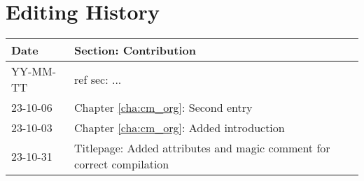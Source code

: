 \cleardoublepage
{}
\chapter*{Editing History}
\label{cha:history}


\begin{longtable}{ |p{2cm}|p{12cm}|}
    \hline
    \textbf{Date} & \textbf{Section: Contribution} \\
    \hline
    YY-MM-TT & ref sec: ...  \\
    \hline
    23-10-06 & Chapter \ref{cha:cm_org}: Second entry \\
    \hline
    23-10-03  & Chapter \ref{cha:cm_org}: Added introduction \\
    \hline
    23-10-31 & Titlepage: Added attributes and magic comment for correct compilation \\ 
    \hline
  \end{longtable}
